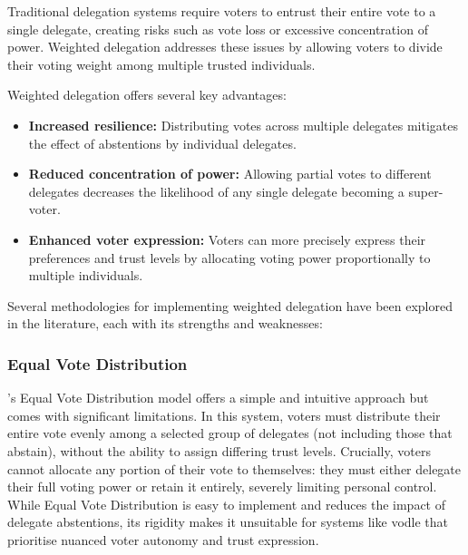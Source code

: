Traditional delegation systems require voters to entrust their entire vote to a single delegate, creating risks such as vote loss or excessive concentration of power. Weighted delegation addresses these issues by allowing voters to divide their voting weight among multiple trusted individuals.


Weighted delegation offers several key advantages:
\begin{itemize}
  \item \textbf{Increased resilience:} Distributing votes across multiple delegates mitigates the effect of abstentions by individual delegates.
  \item \textbf{Reduced concentration of power:} Allowing partial votes to different delegates decreases the likelihood of any single delegate becoming a super-voter.
  \item \textbf{Enhanced voter expression:} Voters can more precisely express their preferences and trust levels by allocating voting power proportionally to multiple individuals.
\end{itemize}

Several methodologies for implementing weighted delegation have been explored in the literature, each with its strengths and weaknesses:

\subsubsection*{Equal Vote Distribution~\citep{degrave2014}}
\citeauthor{degrave2014}'s Equal Vote Distribution model offers a simple and intuitive approach but comes with significant limitations. In this system, voters must distribute their entire vote evenly among a selected group of delegates (not including those that abstain), without the ability to assign differing trust levels. Crucially, voters cannot allocate any portion of their vote to themselves: they must either delegate their full voting power or retain it entirely, severely limiting personal control. While Equal Vote Distribution is easy to implement and reduces the impact of delegate abstentions, its rigidity makes it unsuitable for systems like vodle that prioritise nuanced voter autonomy and trust expression.

